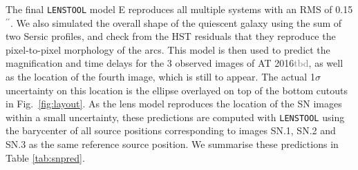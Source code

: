 \documentclass[12pt,dvipsnames]{article}
\gdef\arcsec{$^{\prime\prime}$}
\def\SNABC{AT 2016{\textcolor{Gray}{tbd}}\xspace}
\def\lenstool{{\tt LENSTOOL}\xspace}
\begin{document}
The final \lenstool model E reproduces all multiple systems with an RMS of 0.15\arcsec. We also simulated the overall shape of the quiescent galaxy using the sum of two Sersic profiles, and check from the HST residuals that they reproduce the pixel-to-pixel morphology of the arcs. This model is then used to predict the magnification and time delays for the 3 observed images of \SNABC, as well as the location of the fourth  image, which is still to appear. The actual 1$\sigma$ uncertainty on this location is the ellipse overlayed on top of the bottom cutouts in Fig.~\ref{fig:layout}. As the lens model reproduces the location of the SN images within a small uncertainty, these predictions are computed with \lenstool using the barycenter of all source positions corresponding to images SN.1, SN.2 and SN.3 as the same reference source position. We summarise these predictions in Table \ref{tab:snpred}.
\end{document}
